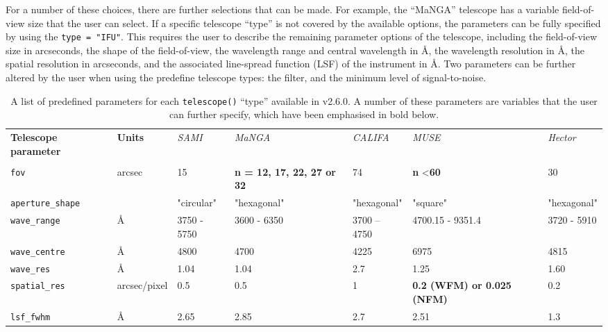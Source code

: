 \documentclass[
  journal=pasa,
  manuscript=research-paper, %
  year=2020,
  volume=37,
]{cup-journal}
\newcommand{\ssversion}[1]{v2.6.0#1}
\newcommand{\telescope}[1]{\texttt{telescope()}#1}
\begin{document}
For a number of these choices, there are further selections that can be made. 
For example, the ``MaNGA'' telescope has a variable field-of-view size that the user can select.
If a specific telescope ``type'' is not covered by the available options, the parameters can be fully specified by using the \texttt{type = "IFU"}. 
This requires the user to describe the remaining parameter options of the telescope, including the field-of-view size in arcseconds, the shape of the field-of-view, the wavelength range and central wavelength in \AA, the wavelength resolution in \AA, the spatial resolution in arcseconds, and the associated line-spread function (LSF) of the instrument in \AA.
Two parameters can be further altered by the user when using the predefine telescope types: the filter, and the minimum level of signal-to-noise. 

\begin{table}[ht!]
\caption{A list of predefined parameters for each \telescope{} ``type'' available in \ssversion. A number of these parameters are variables that the user can further specify, which have been emphasised in bold below.}
\label{tab:telescope_options}
\begin{tabular}{lllllll}
\hline
\textbf{Telescope parameter} & \textbf{Units} & \textit{SAMI} & \textit{MaNGA} & \textit{CALIFA} & \textit{MUSE} & \textit{Hector} \\
 &  & \citep{Croom2012SAMIOverview} & \citep{Bundy2015OverviewObservatory} &  &  &  \\ \hline
\texttt{fov} & arcsec & 15 & \textbf{n = 12, 17, 22, 27 or 32} & 74 & \textbf{n} \textless \textbf{60} & 30 \\
\texttt{aperture\_shape} &  & "circular" & "hexagonal" & "hexagonal" & "square" & "hexagonal" \\
\texttt{wave\_range} & \AA{} & 3750 - 5750 & 3600 - 6350 & 3700 – 4750 & 4700.15 - 9351.4 & 3720 - 5910 \\
\texttt{wave\_centre} & \AA{} & 4800 & 4700 & 4225 & 6975 & 4815 \\
\texttt{wave\_res} & \AA{} & 1.04 & 1.04 & 2.7 & 1.25 & 1.60 \\
\texttt{spatial\_res} & arcsec/pixel & 0.5 & 0.5 & 1 & \textbf{0.2 (WFM) or 0.025 (NFM)} & 0.2 \\
\texttt{lsf\_fwhm} & \AA{} & 2.65 & 2.85 & 2.7 & 2.51 & 1.3 \\ \hline
\end{tabular}
\end{table}
\end{document}
